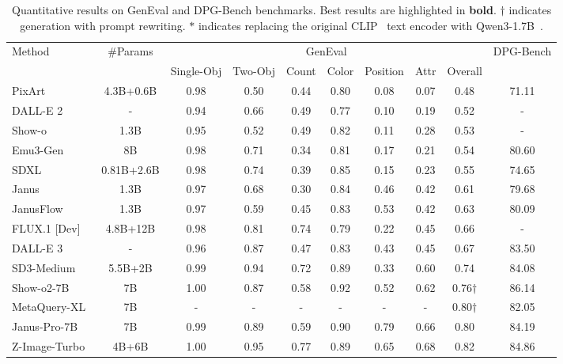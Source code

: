 \documentclass[]{bytedance_seed}
\begin{document}
\begin{table}[t]
\setlength\tabcolsep{4pt}
\centering
\scriptsize 
\caption{Quantitative results on GenEval and DPG-Bench benchmarks. Best results are highlighted in \textbf{bold}. $\dagger$ indicates generation with prompt rewriting. $*$ indicates replacing the original CLIP~\cite{clip} text encoder with Qwen3-1.7B~\cite{bai2025qwen3}.}
\begin{tabular}{lccccccccc}
\toprule
\multirow{2}{*}{Method} & \multirow{2}{*}{\#Params} & \multicolumn{7}{c}{GenEval} & \multirow{2}{*}{DPG-Bench} \\
\cmidrule(lr){3-9}
 & & Single-Obj & Two-Obj & Count & Color & Position & Attr & Overall & \\
\midrule
PixArt~\cite{pixart_sigma}  &   4.3B+0.6B     & 0.98  & 0.50  & 0.44  & 0.80  & 0.08  & 0.07  &  0.48 & 71.11 \\
DALL-E 2\cite{dalle2}  & - & 0.94 & 0.66 & 0.49 & 0.77 & 0.10 & 0.19 & 0.52 & - \\
Show-o~\cite{show_o}   &  1.3B     & 0.95  & 0.52  & 0.49  & 0.82  & 0.11  & 0.28  &  0.53 & - \\
Emu3-Gen~\cite{emu3} &   8B    & 0.98  & 0.71  & 0.34  & 0.81  & 0.17  & 0.21  &  0.54 & 80.60 \\
SDXL\cite{ldm}  & 0.81B+2.6B & 0.98 & 0.74 & 0.39 & 0.85 & 0.15 & 0.23 & 0.55 & 74.65  \\
Janus\cite{janus} & 1.3B & 0.97 & 0.68 & 0.30 & 0.84 & 0.46 & 0.42 & 0.61 & 79.68\\
JanusFlow~\cite{ma2025janusflow} &  1.3B    & 0.97  & 0.59  & 0.45  & 0.83  & 0.53  & 0.42  &  0.63 &  80.09 \\
FLUX.1 [Dev]~\cite{flux1}    &  4.8B+12B    & 0.98  & 0.81  & 0.74  & 0.79  & 0.22  & 0.45  &  0.66 & - \\
DALL-E 3\cite{dalle3}  & - & 0.96 & 0.87 & 0.47 & 0.83 & 0.43 & 0.45 & 0.67 & 83.50 \\
SD3-Medium\cite{mmdit} & 5.5B+2B & 0.99 & 0.94 & 0.72 & 0.89 & 0.33 & 0.60 & 0.74 & 84.08 \\
Show-o2-7B~\cite{show_o2} & 7B & 1.00 & 0.87 & 0.58 & 0.92 & 0.52 & 0.62 & 0.76$\dagger$ & 86.14 \\
MetaQuery-XL\cite{metaquery} & 7B & - & - & - & - & - & - & 0.80$\dagger$ & 82.05 \\
Janus-Pro-7B~\cite{chen2025januspro7b} &  7B  & 0.99  & 0.89  & 0.59  & 0.90  & 0.79  & 0.66  &  0.80  & 84.19\\
Z-Image-Turbo~\cite{team2025zimage} & 4B+6B & 1.00 & 0.95 & 0.77 & 0.89 & 0.65 & 0.68 & 0.82 & 84.86 \\

\end{tabular}
\end{table}
\end{document}
